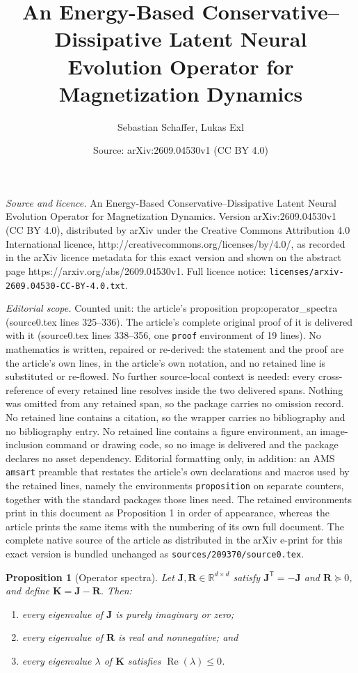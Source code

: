 \documentclass[10pt,a4paper]{amsart}
\title{An Energy-Based Conservative--Dissipative Latent Neural Evolution Operator for Magnetization Dynamics}
\author{Sebastian Schaffer, Lukas Exl}
\date{Source: arXiv:2609.04530v1 (CC BY 4.0)}
\newtheorem{proposition}{Proposition}
\newcommand{\Jop}{\bm J}
\newcommand{\Kop}{\bm K}
\newcommand{\R}{\mathbb{R}}
\newcommand{\Rop}{\bm R}
\begin{document}
\maketitle

\noindent\emph{Source and licence.} An Energy-Based Conservative--Dissipative Latent Neural Evolution Operator for Magnetization Dynamics. Version arXiv:2609.04530v1 (CC BY 4.0), distributed by arXiv under the Creative Commons Attribution 4.0 International licence, http://creativecommons.org/licenses/by/4.0/, as recorded in the arXiv licence metadata for this exact version and shown on the abstract page https://arxiv.org/abs/2609.04530v1. Full licence notice: \texttt{licenses/arxiv-2609.04530-CC-BY-4.0.txt}.\par\smallskip

\noindent\textit{Editorial scope.} Counted unit: the article's proposition prop:operator\_spectra (source0.tex lines 325--336). The article's complete original proof of it is delivered with it (source0.tex lines 338--356, one \texttt{proof} environment of 19 lines). No mathematics is written, repaired or re-derived: the statement and the proof are the article's own lines, in the article's own notation, and no retained line is substituted or re-flowed.  No further source-local context is needed: every cross-reference of every retained line resolves inside the two delivered spans.  Nothing was omitted from any retained span, so the package carries no omission record.  No retained line contains a citation, so the wrapper carries no bibliography and no bibliography entry.  No retained line contains a figure environment, an image-inclusion command or drawing code, so no image is delivered and the package declares no asset dependency.  Editorial formatting only, in addition: an AMS \texttt{amsart} preamble that restates the article's own declarations and macros used by the retained lines, namely the environments \texttt{proposition} on separate counters, together with the standard packages those lines need.  The retained environments print in this document as Proposition 1 in order of appearance, whereas the article prints the same items with the numbering of its own full document.  The complete native source of the article as distributed in the arXiv e-print for this exact version is bundled unchanged as \texttt{sources/209370/source0.tex}.
\begin{proposition}[Operator spectra]
Let $\Jop,\Rop\in\R^{d\times d}$ satisfy
$\Jop^{\mathsf T}=-\Jop$ and $\Rop\succeq0$, and define
$\Kop=\Jop-\Rop$. Then:
\begin{enumerate}[label=(\roman*)]
  \item every eigenvalue of $\Jop$ is purely imaginary or zero;
  \item every eigenvalue of $\Rop$ is real and nonnegative; and
  \item every eigenvalue $\lambda$ of $\Kop$ satisfies
        $\operatorname{Re}(\lambda)\leq0$.
\end{enumerate}
\label{prop:operator_spectra}
\end{proposition}
\end{document}
